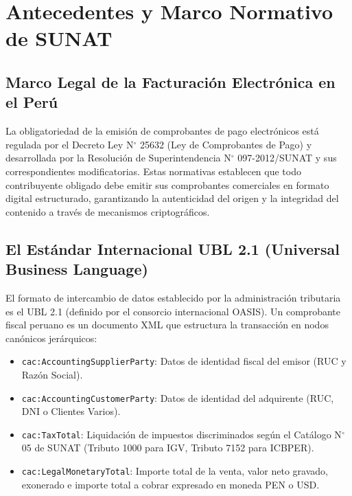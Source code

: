 \documentclass[11pt,a4paper]{article}
\begin{document}
\section{Antecedentes y Marco Normativo de SUNAT}

\subsection{Marco Legal de la Facturación Electrónica en el Perú}
La obligatoriedad de la emisión de comprobantes de pago electrónicos está regulada por el Decreto Ley N$^\circ$ 25632 (Ley de Comprobantes de Pago) y desarrollada por la Resolución de Superintendencia N$^\circ$ 097-2012/SUNAT y sus correspondientes modificatorias. Estas normativas establecen que todo contribuyente obligado debe emitir sus comprobantes comerciales en formato digital estructurado, garantizando la autenticidad del origen y la integridad del contenido a través de mecanismos criptográficos.

\subsection{El Estándar Internacional UBL 2.1 (Universal Business Language)}
El formato de intercambio de datos establecido por la administración tributaria es el UBL 2.1 (definido por el consorcio internacional OASIS). Un comprobante fiscal peruano es un documento XML que estructura la transacción en nodos canónicos jerárquicos:
\begin{itemize}[noitemsep]
    \item \texttt{cac:AccountingSupplierParty}: Datos de identidad fiscal del emisor (RUC y Razón Social).
    \item \texttt{cac:AccountingCustomerParty}: Datos de identidad del adquirente (RUC, DNI o Clientes Varios).
    \item \texttt{cac:TaxTotal}: Liquidación de impuestos discriminados según el Catálogo N$^\circ$ 05 de SUNAT (Tributo 1000 para IGV, Tributo 7152 para ICBPER).
    \item \texttt{cac:LegalMonetaryTotal}: Importe total de la venta, valor neto gravado, exonerado e importe total a cobrar expresado en moneda PEN o USD.
\end{itemize}
\end{document}
